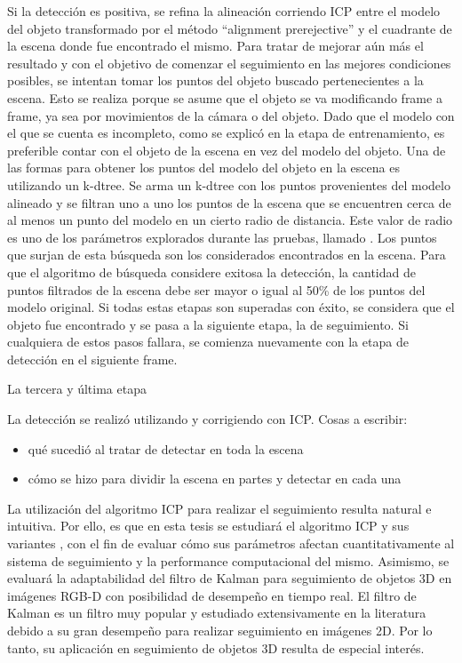 Si la detección es positiva, se refina la alineación corriendo ICP entre el modelo del objeto transformado por el método ``alignment prerejective'' y el cuadrante de la escena donde fue encontrado el mismo. Para tratar de mejorar aún más el resultado y con el objetivo de comenzar el seguimiento en las mejores condiciones posibles, se intentan tomar los puntos del objeto buscado pertenecientes a la escena. Esto se realiza porque se asume que el objeto se va modificando frame a frame, ya sea por movimientos de la cámara o del objeto. Dado que el modelo con el que se cuenta es incompleto, como se explicó en la etapa de entrenamiento, es preferible contar con el objeto de la escena en vez del modelo del objeto. Una de las formas para obtener los puntos del modelo del objeto en la escena es utilizando un k-dtree. Se arma un k-dtree con los puntos provenientes del modelo alineado y se filtran uno a uno los puntos de la escena que se encuentren cerca de al menos un punto del modelo en un cierto radio de distancia. Este valor de radio es uno de los parámetros explorados durante las pruebas, llamado . Los puntos que surjan de esta búsqueda son los considerados encontrados en la escena. Para que el algoritmo de búsqueda considere exitosa la detección, la cantidad de puntos filtrados de la escena debe ser mayor o igual al 50\% de los puntos del modelo original. Si todas estas etapas son superadas con éxito, se considera que el objeto fue encontrado y se pasa a la siguiente etapa, la de seguimiento. Si cualquiera de estos pasos fallara, se comienza nuevamente con la etapa de detección en el siguiente frame.

La tercera y última etapa












La detección se realizó utilizando \cite{6630856} y corrigiendo con ICP.
Cosas a escribir:
\begin{itemize}
	\item qué sucedió al tratar de detectar en toda la escena
	\item cómo se hizo para dividir la escena en partes y detectar en cada una
\end{itemize}


La utilización del algoritmo ICP \cite{zhang94icp,besl92icp} para realizar el seguimiento resulta natural e intuitiva. Por ello, es que en esta tesis se estudiará el algoritmo ICP y sus variantes \cite{estepar2004robust,segal2009generalized}, con el fin de evaluar cómo sus parámetros afectan cuantitativamente al sistema de seguimiento y la performance computacional del mismo. Asimismo, se evaluará la adaptabilidad del filtro de Kalman \cite{welch1995introduction} para seguimiento de objetos 3D en imágenes RGB-D con posibilidad de desempeño en tiempo real. El filtro de Kalman es un filtro muy popular y estudiado extensivamente en la literatura \cite{julier1997new,wan2000unscented} debido a su gran desempeño para realizar seguimiento en imágenes 2D. Por lo tanto, su aplicación en seguimiento de objetos 3D resulta de especial interés.

